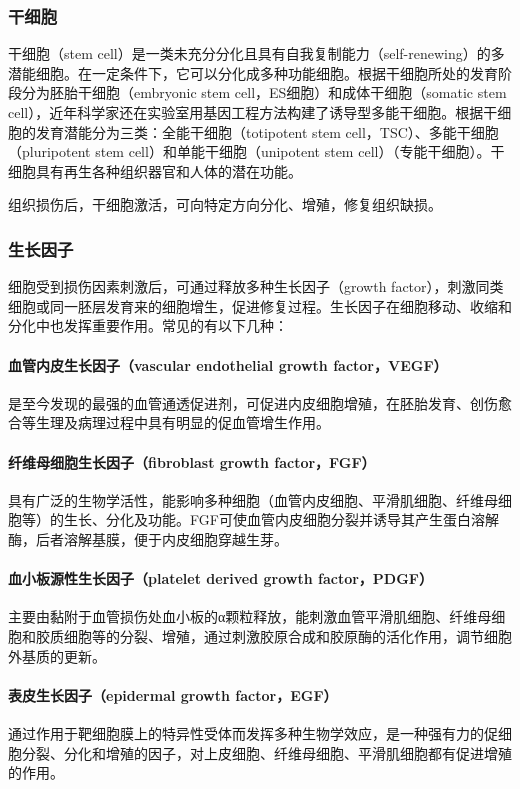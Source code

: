 \subsubsection{干细胞}

干细胞（stem
cell）是一类未充分分化且具有自我复制能力（self-renewing）的多潜能细胞。在一定条件下，它可以分化成多种功能细胞。根据干细胞所处的发育阶段分为胚胎干细胞（embryonic
stem cell，ES细胞）和成体干细胞（somatic stem
cell），近年科学家还在实验室用基因工程方法构建了诱导型多能干细胞。根据干细胞的发育潜能分为三类：全能干细胞（totipotent
stem cell，TSC）、多能干细胞（pluripotent stem
cell）和单能干细胞（unipotent stem
cell）（专能干细胞）。干细胞具有再生各种组织器官和人体的潜在功能。

组织损伤后，干细胞激活，可向特定方向分化、增殖，修复组织缺损。

\subsubsection{生长因子}

细胞受到损伤因素刺激后，可通过释放多种生长因子（growth
factor），刺激同类细胞或同一胚层发育来的细胞增生，促进修复过程。生长因子在细胞移动、收缩和分化中也发挥重要作用。常见的有以下几种：

\paragraph{血管内皮生长因子（vascular endothelial growth factor，VEGF）}
是至今发现的最强的血管通透促进剂，可促进内皮细胞增殖，在胚胎发育、创伤愈合等生理及病理过程中具有明显的促血管增生作用。

\paragraph{纤维母细胞生长因子（fibroblast growth factor，FGF）}
具有广泛的生物学活性，能影响多种细胞（血管内皮细胞、平滑肌细胞、纤维母细胞等）的生长、分化及功能。FGF可使血管内皮细胞分裂并诱导其产生蛋白溶解酶，后者溶解基膜，便于内皮细胞穿越生芽。

\paragraph{血小板源性生长因子（platelet derived growth factor，PDGF）}
主要由黏附于血管损伤处血小板的α颗粒释放，能刺激血管平滑肌细胞、纤维母细胞和胶质细胞等的分裂、增殖，通过刺激胶原合成和胶原酶的活化作用，调节细胞外基质的更新。

\paragraph{表皮生长因子（epidermal growth factor，EGF）}
通过作用于靶细胞膜上的特异性受体而发挥多种生物学效应，是一种强有力的促细胞分裂、分化和增殖的因子，对上皮细胞、纤维母细胞、平滑肌细胞都有促进增殖的作用。

